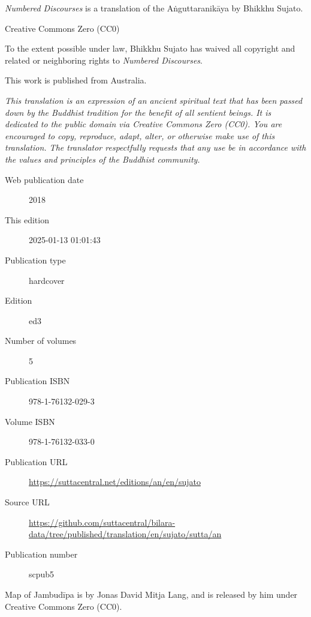 \documentclass[12pt,openany]{book}%
\begin{document}
\begin{footnotesize}

\textit{Numbered Discourses} is a translation of the Aṅguttaranikāya by Bhikkhu Sujato.

\medskip

Creative Commons Zero (CC0)

To the extent possible under law, Bhikkhu Sujato has waived all copyright and related or neighboring rights to \textit{Numbered Discourses}.

\medskip

This work is published from Australia.

\begin{center}
\textit{This translation is an expression of an ancient spiritual text that has been passed down by the Buddhist tradition for the benefit of all sentient beings. It is dedicated to the public domain via Creative Commons Zero (CC0). You are encouraged to copy, reproduce, adapt, alter, or otherwise make use of this translation. The translator respectfully requests that any use be in accordance with the values and principles of the Buddhist community.}
\end{center}

\medskip

\begin{description}
    \item[Web publication date] 2018
    \item[This edition] 2025-01-13 01:01:43
    \item[Publication type] hardcover
    \item[Edition] ed3
    \item[Number of volumes] 5
    \item[Publication ISBN] 978-1-76132-029-3
    \item[Volume ISBN] 978-1-76132-033-0
    \item[Publication URL] \href{https://suttacentral.net/editions/an/en/sujato}{https://suttacentral.net/editions/an/en/sujato}
    \item[Source URL] \href{https://github.com/suttacentral/bilara-data/tree/published/translation/en/sujato/sutta/an}{https://github.com/suttacentral/bilara-data/tree/published/translation/en/sujato/sutta/an}
    \item[Publication number] scpub5
\end{description}

\medskip

Map of Jambudīpa is by Jonas David Mitja Lang, and is released by him under Creative Commons Zero (CC0).


\end{footnotesize}
\end{document}
